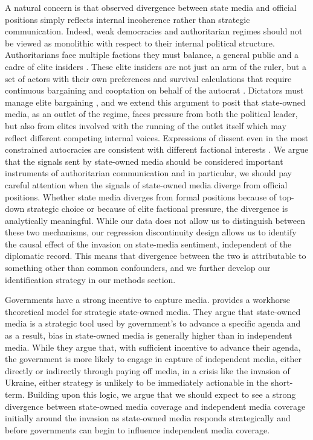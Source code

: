 \documentclass[12pt]{article}
\begin{document}
A natural concern is that observed divergence between state media and official positions simply reflects internal incoherence rather than strategic communication. Indeed, weak democracies and authoritarian regimes should not be viewed as monolithic with respect to their internal political structure. Authoritarians face multiple factions they must balance, a general public and a cadre of elite insiders \citep{svolik_politics_2012}. These elite insiders are not just an arm of the ruler, but a set of actors with their own preferences and survival calculations that require continuous bargaining and cooptation on behalf of the autocrat \citep{bueno_de_mesquita_logic_2003}. Dictators must manage elite bargaining \citep{gandhi_political_2008}, and we extend this argument to posit that state-owned media, as an outlet of the regime, faces pressure from both the political leader, but also from elites involved with the running of the outlet itself which may reflect different competing internal voices. Expressions of dissent even in the most constrained autocracies are consistent with different factional interests \citep{malesky_nodding_2010}. We argue that the signals sent by state-owned media should be considered important instruments of authoritarian communication and in particular, we should pay careful attention when the signals of state-owned media diverge from official positions. Whether state media diverges from formal positions because of top-down strategic choice or because of elite factional pressure, the divergence is analytically meaningful. While our data does not allow us to distinguish between these two mechanisms, our regression discontinuity design allows us to identify the causal effect of the invasion on state-media sentiment, independent of the diplomatic record. This means that divergence between the two is attributable to something other than common confounders, and we further develop our identification strategy in our methods section.



Governments have a strong incentive to capture media. \citet{gehlbach_government_2014} provides a workhorse theoretical model for strategic state-owned media. They argue that state-owned media is a strategic tool used by government's to advance a specific agenda and as a result, bias in state-owned media is generally higher than in independent media. While they argue that, with sufficient incentive to advance their agenda, the government is more likely to engage in capture of independent media, either directly or indirectly through paying off media, in a crisis like the invasion of Ukraine, either strategy is unlikely to be immediately actionable in the short-term. Building upon this logic, we argue that we should expect to see a strong divergence between state-owned media coverage and independent media coverage initially around the invasion as state-owned media responds strategically and before governments can begin to influence independent media coverage. 
\end{document}

